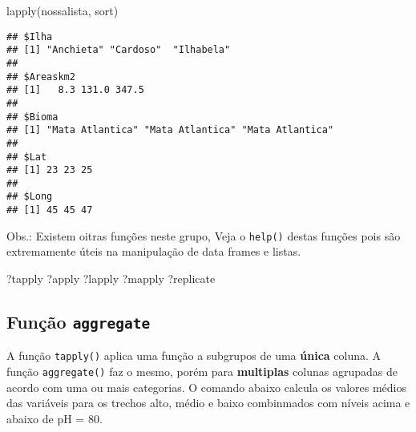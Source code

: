 \documentclass[
]{book}
\newenvironment{Shaded}{\begin{snugshade}}{\end{snugshade}}
\newcommand{\AttributeTok}[1]{\textcolor[rgb]{0.77,0.63,0.00}{#1}}
\newcommand{\DecValTok}[1]{\textcolor[rgb]{0.00,0.00,0.81}{#1}}
\newcommand{\FunctionTok}[1]{\textcolor[rgb]{0.00,0.00,0.00}{#1}}
\newcommand{\NormalTok}[1]{#1}
\newcommand{\OtherTok}[1]{\textcolor[rgb]{0.56,0.35,0.01}{#1}}
\newcommand{\SpecialCharTok}[1]{\textcolor[rgb]{0.00,0.00,0.00}{#1}}
\begin{document}
\begin{Shaded}
\begin{Highlighting}[]
\FunctionTok{lapply}\NormalTok{(nossalista, sort)}
\end{Highlighting}
\end{Shaded}

\begin{verbatim}
## $Ilha
## [1] "Anchieta" "Cardoso"  "Ilhabela"
## 
## $Areaskm2
## [1]   8.3 131.0 347.5
## 
## $Bioma
## [1] "Mata Atlantica" "Mata Atlantica" "Mata Atlantica"
## 
## $Lat
## [1] 23 23 25
## 
## $Long
## [1] 45 45 47
\end{verbatim}

Obs.: Existem oitras funções neste grupo, Veja o \texttt{help()} destas funções pois são extremamente úteis na manipulação de data frames e listas.

\begin{Shaded}
\begin{Highlighting}[]
\NormalTok{?tapply}
\NormalTok{?apply}
\NormalTok{?lapply}
\NormalTok{?mapply}
\NormalTok{?replicate}
\end{Highlighting}
\end{Shaded}

\hypertarget{funuxe7uxe3o-aggregate}{%
\subsection{\texorpdfstring{Função \texttt{aggregate}}{Função aggregate}}\label{funuxe7uxe3o-aggregate}}

A função \texttt{tapply()} aplica uma função a subgrupos de uma \textbf{única} coluna. A função \texttt{aggregate()} faz o mesmo, porém para \textbf{multiplas} colunas agrupadas de acordo com uma ou mais categorias. O comando abaixo calcula os valores médios das variáveis para os trechos alto, médio e baixo combinmados com níveis acima e abaixo de pH = 80.

\begin{Shaded}
\end{Shaded}
\end{document}

